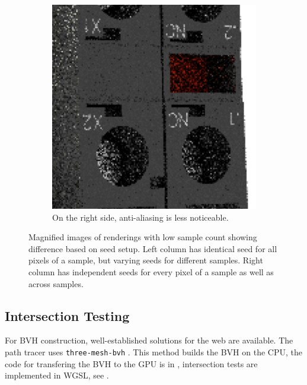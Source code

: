 \begin{figure}[H]
\begin{subfigure}[t]{0.3\textwidth}
        \includegraphics[width=\textwidth]{resources/good-seed-anti-aliasing.png}
        \caption{On the right side, anti-aliasing is less noticeable.}
        \label{fig:rngNoiseArtifactsHighlightsGoodAnti}
    \end{subfigure}
    \hspace*{2cm}
    \caption{Magnified images of renderings with low sample count showing difference based on seed setup. Left column has identical seed for all pixels of a sample, but varying seeds for different samples. Right column has independent seeds for every pixel of a sample as well as across samples.}
    \label{fig:rngNoiseArtifactsHighlights}
\end{figure}

\subsection{Intersection Testing}

For \gls{BVH} construction, well-established solutions for the web are available. The path tracer uses \texttt{three-mesh-bvh} \cite{threeMeshBvh}. This method builds the \gls{BVH} on the \gls{CPU}, the code for transfering the \gls{BVH} to the \gls{GPU} is in , intersection tests are implemented in \gls{WGSL}, see .

